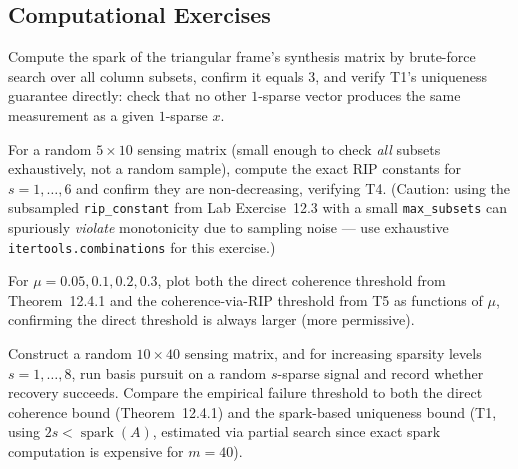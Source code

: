 \subsection*{Computational Exercises}
\begin{compexercises}
	\item Compute the spark of the triangular frame's synthesis matrix by
	brute-force search over all column subsets, confirm it equals
	$3$, and verify T1's uniqueness guarantee directly: check that no
	other $1$-sparse vector produces the same measurement as a given
	$1$-sparse $x$.
	
	\item For a random $5\times10$ sensing matrix (small enough to check
	\emph{all} subsets exhaustively, not a random sample), compute
	the exact RIP constants for $s=1,\ldots,6$ and confirm they are
	non-decreasing, verifying T4. (Caution: using the subsampled
	\texttt{rip\_constant} from Lab Exercise~12.3 with a small
	\texttt{max\_subsets} can spuriously \emph{violate} monotonicity
	due to sampling noise --- use exhaustive
	\texttt{itertools.combinations} for this exercise.)
	
	\item For $\mu=0.05,0.1,0.2,0.3$, plot both the direct coherence
	threshold from Theorem~12.4.1 and the coherence-via-RIP threshold
	from T5 as functions of $\mu$, confirming the direct threshold is
	always larger (more permissive).
	
	\item Construct a random $10\times40$ sensing matrix, and for
	increasing sparsity levels $s=1,\ldots,8$, run basis pursuit on a
	random $s$-sparse signal and record whether recovery succeeds.
	Compare the empirical failure threshold to both the direct
	coherence bound (Theorem~12.4.1) and the spark-based uniqueness
	bound (T1, using $2s<\operatorname{spark}(A)$, estimated via
	partial search since exact spark computation is expensive for
	$m=40$).
\end{compexercises}
